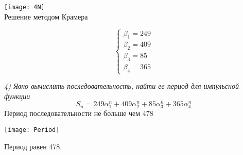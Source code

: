 \begin{center}
  \texttt{[image: 4N]}\\
  Решение методом Крамера
\end{center}

\begin{equation*}
 \begin{cases}
    \beta_1 = 249\\
    \beta_2 = 409\\
    \beta_3 = 85\\
    \beta_4 = 365
 \end{cases}
\end{equation*}

\emph {4) Явно вычислить последовательность, найти ее период для импульсной
функции}\\
\[S_n = 249\alpha_{1}^{n} + 409\alpha_{2}^{n} + 85\alpha_{3}^{n} +
365\alpha_{4}^{n}\]
Период последовательности не больше чем 478\\

\begin{center}
  \texttt{[image: Period]}\\
\end{center}

Период равен 478.